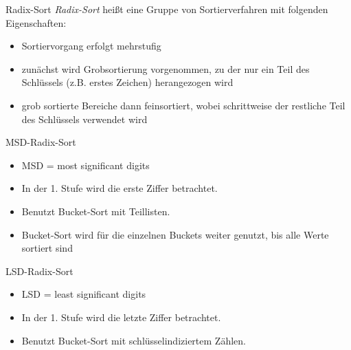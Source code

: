\begin{defi}{Radix-Sort}
    \emph{Radix-Sort} heißt eine Gruppe von Sortierverfahren mit folgenden Eigenschaften:
    \begin{itemize}
        \item Sortiervorgang erfolgt mehrstufig
        \item zunächst wird Grobsortierung vorgenommen, zu der nur ein Teil des Schlüssels (z.B. erstes Zeichen) herangezogen wird
        \item grob sortierte Bereiche dann feinsortiert, wobei schrittweise der restliche Teil des Schlüssels verwendet wird
    \end{itemize}
\end{defi}

\begin{bonus}{MSD-Radix-Sort}
    \begin{itemize}
        \item MSD = most significant digits
        \item In der 1. Stufe wird die erste Ziffer betrachtet.
        \item Benutzt Bucket-Sort mit Teillisten.
        \item Bucket-Sort wird für die einzelnen Buckets weiter genutzt, bis alle Werte sortiert sind
    \end{itemize}
\end{bonus}

\begin{bonus}{LSD-Radix-Sort}
    \begin{itemize}
        \item LSD = least significant digits
        \item In der 1. Stufe wird die letzte Ziffer betrachtet.
        \item Benutzt Bucket-Sort mit schlüsselindiziertem Zählen.
    \end{itemize}
\end{bonus}

